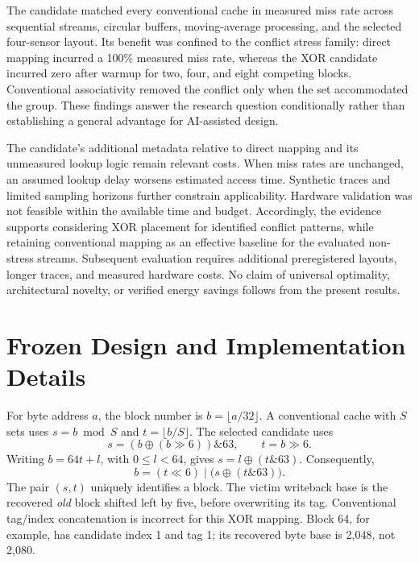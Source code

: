 \documentclass[11pt,a4paper]{article}
\begin{document}
The candidate matched every conventional cache in measured miss rate across sequential streams, circular buffers, moving-average processing, and the selected four-sensor layout. Its benefit was confined to the conflict stress family: direct mapping incurred a 100\% measured miss rate, whereas the XOR candidate incurred zero after warmup for two, four, and eight competing blocks. Conventional associativity removed the conflict only when the set accommodated the group. These findings answer the research question conditionally rather than establishing a general advantage for AI-assisted design.

The candidate's additional metadata relative to direct mapping and its unmeasured lookup logic remain relevant costs. When miss rates are unchanged, an assumed lookup delay worsens estimated access time. Synthetic traces and limited sampling horizons further constrain applicability. Hardware validation was not feasible within the available time and budget. Accordingly, the evidence supports considering XOR placement for identified conflict patterns, while retaining conventional mapping as an effective baseline for the evaluated non-stress streams. Subsequent evaluation requires additional preregistered layouts, longer traces, and measured hardware costs. No claim of universal optimality, architectural novelty, or verified energy savings follows from the present results.

\clearpage



\clearpage
\appendix
\section{Frozen Design and Implementation Details}\label{app:design}
For byte address $a$, the block number is $b=\lfloor a/32\rfloor$. A conventional cache with $S$ sets uses $s=b\bmod S$ and $t=\lfloor b/S\rfloor$. The selected candidate uses
\begin{equation}
s=(b\oplus(b\gg6))\mathbin{\&}63,\qquad t=b\gg6.
\end{equation}
Writing $b=64t+l$, with $0\le l<64$, gives $s=l\oplus(t\mathbin{\&}63)$. Consequently,
\begin{equation}
b=(t\ll6)\mathbin{|}\bigl(s\oplus(t\mathbin{\&}63)\bigr).
\end{equation}
The pair $(s,t)$ uniquely identifies a block. The victim writeback base is the recovered \emph{old} block shifted left by five, before overwriting its tag. Conventional tag/index concatenation is incorrect for this XOR mapping. Block 64, for example, has candidate index 1 and tag 1; its recovered byte base is 2,048, not 2,080.
\end{document}
